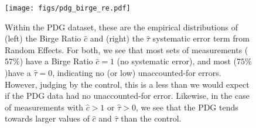 \documentclass[letterpaper,12pt]{article}
\begin{document}



\begin{figure}[htbp]
\centering
\texttt{[image: figs/pdg\_birge\_re.pdf]}
\caption{Within the PDG dataset, these are the empirical distributions of (left) the Birge Ratio $\hat c$ and (right) the $\hat\tau$ systematic error term from Random Effects. For both, we see that most sets of measurements ($57\%$) have a Birge Ratio $\hat c=1$ (no systematic error), and most ($75\%$)have a $\hat\tau=0$, indicating no (or low) unaccounted-for errors. However, judging by the control, this is a less than we would expect if the PDG data had no unaccounted-for error. Likewise, in the case of measurements with $\hat c>1$ or $\hat\tau>0$, we see that the PDG tends towards larger values of $\hat c$ and $\hat\tau$ than the control.
}
\label{fig:pdg-birge-re}
\end{figure}
\end{document}
